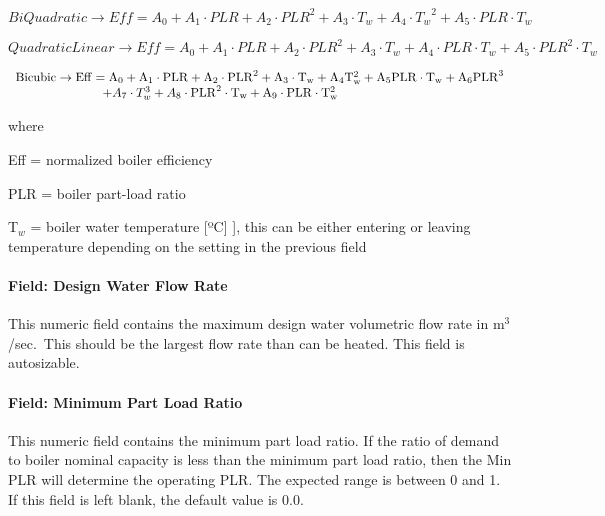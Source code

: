\begin{equation}
BiQuadratic \to Eff = {A_0} + {A_1}\cdot PLR + {A_2}\cdot PL{R^2} + {A_3}\cdot {T_w} + {A_4}\cdot {T_w}^2 + {A_5}\cdot PLR\cdot {T_w}
\end{equation}

\begin{equation}
QuadraticLinear \to Eff = {A_0} + {A_1}\cdot PLR + {A_2}\cdot PL{R^2} + {A_3}\cdot {T_w} + {A_4}\cdot PLR\cdot {T_w} + {A_5}\cdot PL{R^2}\cdot {T_w}
\end{equation}

\begin{equation}
\begin{array}{l}
  \rm{Bicubic} \to \rm{Eff} = A_0 + A_1 \cdot \rm{PLR} + A_2 \cdot \rm{PLR}^2 + A_3 \cdot T_w + A_4 T_w^2 + A_5 \rm{PLR} \cdot T_w + A_6 \rm{PLR}^3 \\
  \quad \quad \quad \quad \quad \quad \quad  + A_7 \cdot T_w^3 + A_8 \cdot \rm{PLR}^2 \cdot T_w + A_9 \cdot \rm{PLR} \cdot T_w^2
\end{array}
\end{equation}

where

Eff = normalized boiler efficiency

PLR = boiler part-load ratio

T\(_{w}\) = boiler water temperature {[}ºC{]} {]}, this can be either entering or leaving temperature depending on the setting in the previous field

\paragraph{Field: Design Water Flow Rate}\label{field-design-water-flow-rate-001}

This numeric field contains the maximum design water volumetric flow rate in m\(^{3}\)/sec.~This should be the largest flow rate than can be heated. This field is autosizable.

\paragraph{Field: Minimum Part Load Ratio}\label{field-minimum-part-load-ratio-9}

This numeric field contains the minimum part load ratio. If the ratio of demand to boiler nominal capacity is less than the minimum part load ratio, then the Min PLR will determine the operating PLR. The expected range is between 0 and 1. If this field is left blank, the default value is 0.0.

